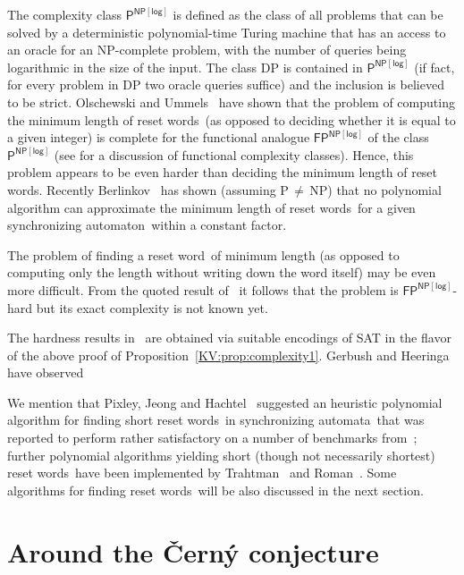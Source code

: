 \documentclass{irmaart}
\newcommand{\sa}{synchronizing au\-tom\-a\-ta}
\newcommand{\san}{synchronizing au\-tom\-a\-ton}
\newcommand{\sw}{reset word}
\newcommand{\sws}{reset words}
\theoremstyle{plain}
\begin{document}
The complexity class $\mathsf{P}^\mathsf{NP[log]}$ is defined as
the class of all problems that can be solved by a deterministic
polynomial-time Turing machine that has an access to an oracle for
an \textsf{NP}-complete problem, with the number of queries being
logarithmic in the size of the input. The class \textsf{DP} is
contained in $\mathsf{P}^\mathsf{NP[log]}$ (if fact, for every
problem in \textsf{DP} two oracle queries suffice) and the
inclusion is believed to be strict. Olschewski and
Ummels~\cite{Olschewski&Ummels:2010} have shown that the problem
of computing the minimum length of \sws\ (as opposed to deciding
whether it is equal to a given integer) is complete for the
functional analogue $\mathsf{FP}^\mathsf{NP[log]}$ of the class
$\mathsf{P}^\mathsf{NP[log]}$ (see \cite{Selman:1994} for a
discussion of functional complexity classes). Hence, this problem
appears to be even harder than deciding the minimum length of
\sws. Recently Berlinkov~\cite{Berlinkov:2010} has shown (assuming
\textsf{P}\,$\ne$\,\textsf{NP}) that no polynomial algorithm can
approximate the minimum length of \sws\ for a given \san\ within a
constant factor.

The problem of finding a \sw\ of minimum length (as opposed to
computing only the length without writing down the word itself)
may be even more difficult. From the quoted result
of~\cite{Olschewski&Ummels:2010} it follows that the problem is
$\mathsf{FP}^\mathsf{NP[log]}$-hard but its exact complexity is
not known yet.

The hardness results in~\cite{Berlinkov:2010,Olschewski&Ummels:2010} are
obtained via suitable encodings of \textsc{SAT} in the flavor of the above
proof of Proposition~\ref{KV:prop:complexity1}. Gerbush and
Heeringa~\cite{Gerbush&Heeringa:2011} have observed 

We mention that Pixley, Jeong and Hachtel~\cite{Pixley&Jeong&Hachtel:1992}
suggested an heuristic polynomial algorithm for finding short \sws\ in \sa\
that was reported to perform rather satisfactory on a number of benchmarks
from~\cite{Yang:1991}; further polynomial algorithms yielding short (though not
necessarily shortest) \sws\ have been implemented by
Trahtman~\cite{Trahtman:2006} and Roman~\cite{Roman:2009,Roman:2009a}. Some
algorithms for finding \sws\ will be also discussed in the next section.

\section{Around the \v{C}ern\'{y} conjecture}
\end{document}
